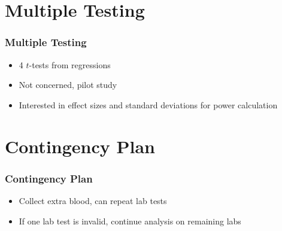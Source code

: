 \documentclass[xcolor=dvipsnames]{beamer}
\begin{document}

\section{Multiple Testing}

\begin{frame}
\frametitle{Multiple Testing}
\begin{itemize}
\item 4 $t$-tests from regressions
\item Not concerned, pilot study
\item Interested in effect sizes and standard deviations for power calculation
\end{itemize}
\end{frame}



\section{Contingency Plan}

\begin{frame}
\frametitle{Contingency Plan}
\begin{itemize}
\item Collect extra blood, can repeat lab tests
\item If one lab test is invalid, continue analysis on remaining labs
\end{itemize}
\end{frame}



\end{document}
